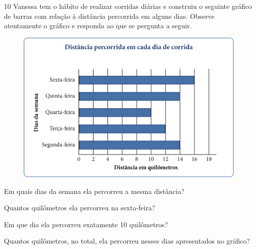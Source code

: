 \begin{mdframed}[linewidth=2pt,linecolor=salmao,roundcorner=2pt]
\vspace{10cm}
\end{mdframed}

\num{10} Vanessa tem o hábito de realizar corridas diárias e construiu o seguinte
gráfico de barras com relação à distância percorrida em alguns dias. Observe atentamente o gráfico e responda ao que se pergunta a seguir.

\begin{figure}[htpb!]
\centering
\includegraphics[width=\textwidth]{media/image49.png}
\end{figure}

\begin{escolha}
\item
  Em quais dias da semana ela percorreu a mesma distância?
\item{}

\item
  Quantos quilômetros ela percorreu na sexta-feira?
\item{}

\item
  Em que dia ela percorreu exatamente 10 quilômetros?
\item{}

\item
  Quantos quilômetros, no total, ela percorreu nesses dias apresentados no gráfico?
\item{}
\end{escolha}


